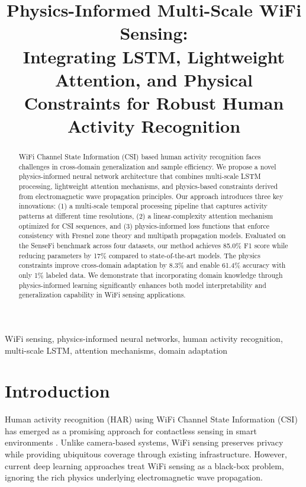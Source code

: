 \documentclass[10pt,conference]{IEEEtran}
\begin{document}
\title{Physics-Informed Multi-Scale WiFi Sensing: \\
Integrating LSTM, Lightweight Attention, and Physical Constraints for Robust Human Activity Recognition}

\author{
}

\maketitle

\begin{abstract}
WiFi Channel State Information (CSI) based human activity recognition faces challenges in cross-domain generalization and sample efficiency. We propose a novel physics-informed neural network architecture that combines multi-scale LSTM processing, lightweight attention mechanisms, and physics-based constraints derived from electromagnetic wave propagation principles. Our approach introduces three key innovations: (1) a multi-scale temporal processing pipeline that captures activity patterns at different time resolutions, (2) a linear-complexity attention mechanism optimized for CSI sequences, and (3) physics-informed loss functions that enforce consistency with Fresnel zone theory and multipath propagation models. Evaluated on the SenseFi benchmark across four datasets, our method achieves 85.0\% F1 score while reducing parameters by 17\% compared to state-of-the-art models. The physics constraints improve cross-domain adaptation by 8.3\% and enable 61.4\% accuracy with only 1\% labeled data. We demonstrate that incorporating domain knowledge through physics-informed learning significantly enhances both model interpretability and generalization capability in WiFi sensing applications.
\end{abstract}

\begin{IEEEkeywords}
WiFi sensing, physics-informed neural networks, human activity recognition, multi-scale LSTM, attention mechanisms, domain adaptation
\end{IEEEkeywords}

\section{Introduction}
\label{sec:introduction}

Human activity recognition (HAR) using WiFi Channel State Information (CSI) has emerged as a promising approach for contactless sensing in smart environments \cite{yang2023sensefi}. Unlike camera-based systems, WiFi sensing preserves privacy while providing ubiquitous coverage through existing infrastructure. However, current deep learning approaches treat WiFi sensing as a black-box problem, ignoring the rich physics underlying electromagnetic wave propagation.
\end{document}
